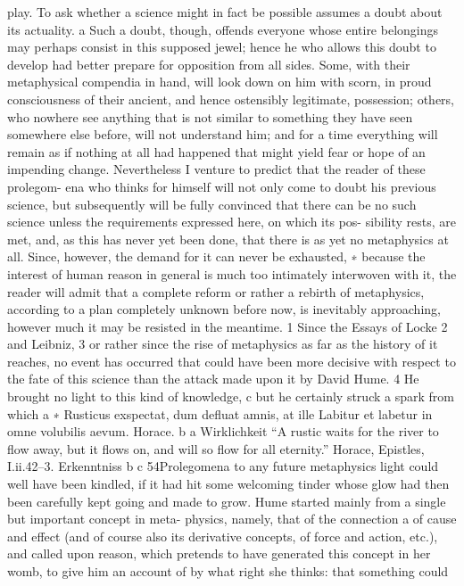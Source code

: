 play.
To ask whether a science might in fact be possible assumes a doubt
about its actuality. a Such a doubt, though, offends everyone whose entire
belongings may perhaps consist in this supposed jewel; hence he who
allows this doubt to develop had better prepare for opposition from all
sides. Some, with their metaphysical compendia in hand, will look down
on him with scorn, in proud consciousness of their ancient, and hence
ostensibly legitimate, possession; others, who nowhere see anything that
is not similar to something they have seen somewhere else before, will
not understand him; and for a time everything will remain as if nothing at
all had happened that might yield fear or hope of an impending change.
Nevertheless I venture to predict that the reader of these prolegom-
ena who thinks for himself will not only come to doubt his previous
science, but subsequently will be fully convinced that there can be no
such science unless the requirements expressed here, on which its pos-
sibility rests, are met, and, as this has never yet been done, that there is
as yet no metaphysics at all. Since, however, the demand for it can never
be exhausted, ∗ because the interest of human reason in general is much
too intimately interwoven with it, the reader will admit that a complete
reform or rather a rebirth of metaphysics, according to a plan completely
unknown before now, is inevitably approaching, however much it may
be resisted in the meantime. 1
Since the Essays of Locke 2 and Leibniz, 3 or rather since the rise of
metaphysics as far as the history of it reaches, no event has occurred that
could have been more decisive with respect to the fate of this science
than the attack made upon it by David Hume. 4 He brought no light to
this kind of knowledge, c but he certainly struck a spark from which a
∗ Rusticus exspectat, dum deﬂuat amnis, at ille
Labitur et labetur in omne volubilis aevum. Horace. b
a Wirklichkeit
“A rustic waits for the river to ﬂow away, but it ﬂows on, and will so ﬂow for all eternity.”
Horace, Epistles, I.ii.42–3.
Erkenntniss
b
c
54Prolegomena to any future metaphysics
light could well have been kindled, if it had hit some welcoming tinder
whose glow had then been carefully kept going and made to grow.
Hume started mainly from a single but important concept in meta-
physics, namely, that of the connection a of cause and effect (and of course
also its derivative concepts, of force and action, etc.), and called upon
reason, which pretends to have generated this concept in her womb, to
give him an account of by what right she thinks: that something could
